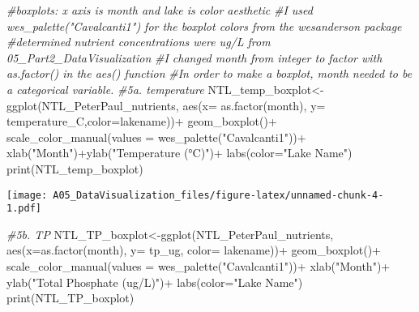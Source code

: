 \documentclass[
]{article}
\newenvironment{Shaded}{\begin{snugshade}}{\end{snugshade}}
\newcommand{\AttributeTok}[1]{\textcolor[rgb]{0.77,0.63,0.00}{#1}}
\newcommand{\CommentTok}[1]{\textcolor[rgb]{0.56,0.35,0.01}{\textit{#1}}}
\newcommand{\FunctionTok}[1]{\textcolor[rgb]{0.00,0.00,0.00}{#1}}
\newcommand{\NormalTok}[1]{#1}
\newcommand{\OtherTok}[1]{\textcolor[rgb]{0.56,0.35,0.01}{#1}}
\newcommand{\SpecialCharTok}[1]{\textcolor[rgb]{0.00,0.00,0.00}{#1}}
\newcommand{\StringTok}[1]{\textcolor[rgb]{0.31,0.60,0.02}{#1}}
\begin{document}
\begin{Shaded}
\begin{Highlighting}[]
\CommentTok{\#boxplots: x axis is month and lake is color aesthetic}
\CommentTok{\#I used wes\_palette("Cavalcanti1") for the boxplot colors from the wesanderson package}
\CommentTok{\#determined nutrient concentrations were ug/L from 05\_Part2\_DataVisualization}
\CommentTok{\#I changed month from integer to factor with as.factor() in the aes() function}
\CommentTok{\#In order to make a boxplot, month needed to be a categorical variable.}
\CommentTok{\#5a. temperature}
\NormalTok{NTL\_temp\_boxplot}\OtherTok{\textless{}{-}}\FunctionTok{ggplot}\NormalTok{(NTL\_PeterPaul\_nutrients, }\FunctionTok{aes}\NormalTok{(}\AttributeTok{x=} \FunctionTok{as.factor}\NormalTok{(month),}
                  \AttributeTok{y=}\NormalTok{ temperature\_C,}\AttributeTok{color=}\NormalTok{lakename))}\SpecialCharTok{+}
                  \FunctionTok{geom\_boxplot}\NormalTok{()}\SpecialCharTok{+}
                  \FunctionTok{scale\_color\_manual}\NormalTok{(}\AttributeTok{values =} \FunctionTok{wes\_palette}\NormalTok{(}\StringTok{"Cavalcanti1"}\NormalTok{))}\SpecialCharTok{+}
                  \FunctionTok{xlab}\NormalTok{(}\StringTok{"Month"}\NormalTok{)}\SpecialCharTok{+}\FunctionTok{ylab}\NormalTok{(}\StringTok{"Temperature (°C)"}\NormalTok{)}\SpecialCharTok{+}
                  \FunctionTok{labs}\NormalTok{(}\AttributeTok{color=}\StringTok{"Lake Name"}\NormalTok{)}
\FunctionTok{print}\NormalTok{(NTL\_temp\_boxplot)}
\end{Highlighting}
\end{Shaded}

\texttt{[image: A05\_DataVisualization\_files/figure-latex/unnamed-chunk-4-1.pdf]}

\begin{Shaded}
\begin{Highlighting}[]
\CommentTok{\#5b. TP}
\NormalTok{NTL\_TP\_boxplot}\OtherTok{\textless{}{-}}\FunctionTok{ggplot}\NormalTok{(NTL\_PeterPaul\_nutrients, }
                \FunctionTok{aes}\NormalTok{(}\AttributeTok{x=}\FunctionTok{as.factor}\NormalTok{(month), }\AttributeTok{y=}\NormalTok{ tp\_ug, }\AttributeTok{color=}\NormalTok{ lakename))}\SpecialCharTok{+}
                \FunctionTok{geom\_boxplot}\NormalTok{()}\SpecialCharTok{+}
                \FunctionTok{scale\_color\_manual}\NormalTok{(}\AttributeTok{values =} \FunctionTok{wes\_palette}\NormalTok{(}\StringTok{"Cavalcanti1"}\NormalTok{))}\SpecialCharTok{+}
                \FunctionTok{xlab}\NormalTok{(}\StringTok{"Month"}\NormalTok{)}\SpecialCharTok{+}
                \FunctionTok{ylab}\NormalTok{(}\StringTok{"Total Phosphate (ug/L)"}\NormalTok{)}\SpecialCharTok{+}
                \FunctionTok{labs}\NormalTok{(}\AttributeTok{color=}\StringTok{"Lake Name"}\NormalTok{)}
\FunctionTok{print}\NormalTok{(NTL\_TP\_boxplot)}
\end{Highlighting}
\end{Shaded}
\end{document}
